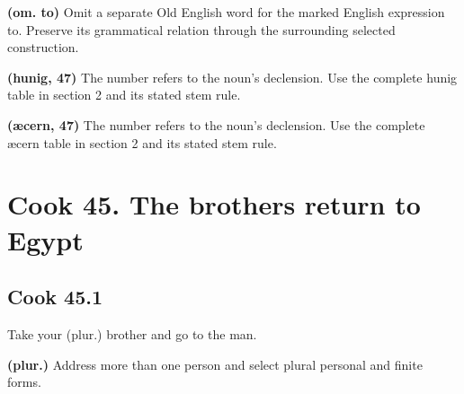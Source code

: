 \textbf{(om. to)} Omit a separate Old English word for the marked English expression to. Preserve its grammatical relation through the surrounding selected construction.

\textbf{(hunig, 47)} The number refers to the noun’s declension. Use the complete hunig table in section 2 and its stated stem rule.

\textbf{(æcern, 47)} The number refers to the noun’s declension. Use the complete æcern table in section 2 and its stated stem rule.

\section*{Cook 45. The brothers return to Egypt}

\par\begin{minipage}{\linewidth}\raggedright
\subsection*{Cook 45.1}

Take your (plur.) brother and go to the man.

\textbf{(plur.)} Address more than one person and select plural personal and finite forms.

\end{minipage}\par\addvspace{4pt}

